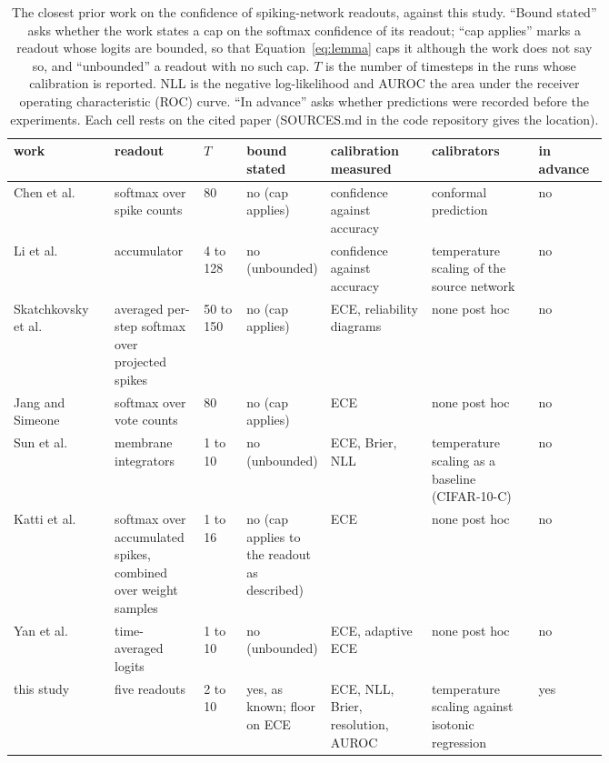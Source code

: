 \documentclass[10pt]{article}
\begin{document}
\begin{table}[t]
\centering
\caption{The closest prior work on the confidence of spiking-network readouts, against this
study. ``Bound stated'' asks whether the work states a cap on the softmax confidence of its
readout; ``cap applies'' marks a readout whose logits are bounded, so that Equation~\eqref{eq:lemma}
caps it although the work does not say so, and ``unbounded'' a readout with no such cap.
$T$ is the number of timesteps in the runs whose calibration is reported. NLL is the negative
log-likelihood and AUROC the area under the receiver operating characteristic (ROC) curve. ``In advance'' asks
whether predictions were recorded before the experiments. Each cell rests
on the cited paper (SOURCES.md in the code repository gives the location).}
\label{tab:related}
\footnotesize
\setlength{\tabcolsep}{3pt}
\begin{tabular}{>{\raggedright\arraybackslash}p{0.17\linewidth}>{\raggedright\arraybackslash}p{0.15\linewidth}l>{\raggedright\arraybackslash}p{0.09\linewidth}>{\raggedright\arraybackslash}p{0.17\linewidth}>{\raggedright\arraybackslash}p{0.18\linewidth}l}
\toprule
work & readout & $T$ & bound stated & calibration measured & calibrators & in advance \\
\midrule
Chen et al.~\citep{chen2025knowing} & softmax over spike counts & 80 & no (cap applies) & confidence against accuracy & conformal prediction & no \\ %
Li et al.~\citep{li2023dynamic} & accumulator & 4 to 128 & no (unbounded) & confidence against accuracy & temperature scaling of the source network & no \\ %
Skatchkovsky et al.~\citep{skatchkovsky2022bayesian} & averaged per-step softmax over projected spikes & 50 to 150 & no (cap applies) & ECE, reliability diagrams & none post hoc & no \\ %
Jang and Simeone~\citep{jang2022multisample} & softmax over vote counts & 80 & no (cap applies) & ECE & none post hoc & no \\ %
Sun et al.~\citep{sun2023mcdropout} & membrane integrators & 1 to 10 & no (unbounded) & ECE, Brier, NLL & temperature scaling as a baseline (CIFAR-10-C) & no \\ %
Katti et al.~\citep{katti2024bayesian} & softmax over accumulated spikes, combined over weight samples & 1 to 16 & no (cap applies to the readout as described) & ECE & none post hoc & no \\ %
Yan et al.~\citep{yan2025temporal} & time-averaged logits & 1 to 10 & no (unbounded) & ECE, adaptive ECE & none post hoc & no \\ %
this study & five readouts & 2 to 10 & yes, as known; floor on ECE & ECE, NLL, Brier, resolution, AUROC & temperature scaling against isotonic regression & yes \\
\bottomrule
\end{tabular}
\end{table}
\end{document}
